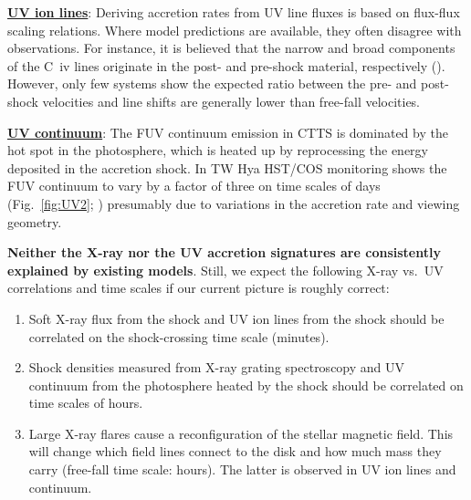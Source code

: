\documentclass[letterpaper,11pt,twocolumn]{article}
\begin{document}
\underline{\bf UV ion lines}: Deriving accretion rates from UV line
fluxes is based on flux-flux scaling relations. Where model
predictions are available, they often disagree with observations. For
instance, it is believed that the narrow and broad components of the
C~{\sc iv} lines originate in the post- and pre-shock material,
respectively (). However, only few systems
show the expected ratio between the pre- and post-shock velocities and
line shifts are generally lower than free-fall velocities.

\underline{\bf UV continuum}: The FUV continuum emission in CTTS is
dominated by the hot spot in the photosphere, which is heated up by
reprocessing the energy deposited in the accretion shock. In
TW Hya HST/COS monitoring shows the FUV
continuum to vary by a factor of three on time scales of days
(Fig.~\ref{fig:UV2}; ) presumably due to variations in the
accretion rate and viewing geometry.


{\bf Neither the X-ray nor the UV accretion signatures are consistently explained by existing models}. Still, we expect the following X-ray vs.\ UV correlations and time scales if our current picture is roughly correct:
\begin{enumerate}
    \itemsep1pt
    \item Soft X-ray flux from the shock and UV ion lines from the shock should be correlated on the shock-crossing time scale (minutes).
    \item Shock densities measured from X-ray grating
      spectroscopy and UV continuum from the
      photosphere heated by the shock should be correlated on time
      scales of hours.
    \item Large X-ray flares cause a reconfiguration of the stellar
      magnetic field. This will change which field lines connect to
      the disk and how much mass they carry (free-fall time scale:
      hours). The latter is observed in UV ion lines and continuum.
\end{enumerate}
\end{document}
